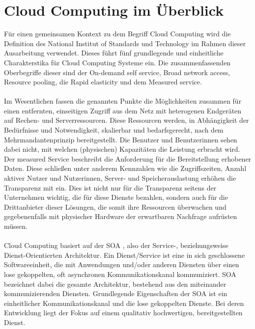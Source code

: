 \section{Cloud Computing im Überblick}
\label{VgmCC}
Für einen gemeinsamen Kontext zu dem Begriff Cloud Computing wird die Definition des National Institut of Standards und Technology im Rahmen dieser Ausarbeitung verwendet. Dieses führt fünf grundlegende und einheitliche Charakterstika für Cloud Computing Systeme ein. Die zusammenfassenden Oberbegriffe dieser sind der On-demand self service, Broad network access, Resource pooling, die Rapid elasticity und dem Measured service.
\\\\
Im Wesentlichen fassen die genannten Punkte die Möglichkeiten zusammen für einen entfernten, einseitigen Zugriff aus dem Netz mit heterogenen Endgeräten auf Rechen- und Serverressourcen. Diese Ressourcen werden, in Abhängigkeit der Bedürfnisse und Notwendigkeit, skalierbar und bedarfsgerecht, nach dem Mehrmandantenprinzip bereitgestellt. Die Benutzer und Benutzerinnen sehen dabei nicht, mit welchen (physischen) Kapazitäten die Leistung erbracht wird. Der measured Service beschreibt die Anforderung für die Bereitstellung erhobener Daten. Diese schließen unter anderem Kennzahlen wie die Zugriffszeiten, Anzahl aktiver Nutzer und Nutzerinnen, Server- und Speicherauslastung erhöhen die Transparenz mit ein. Dies ist nicht nur für die Transparenz seitens der Unternehmen wichtig, die für diese Dienste bezahlen, sondern auch für die Drittanbieter dieser Lösungen, die somit ihre Ressourcen überwachen und gegebenenfalls mit physischer Hardware der erwartbaren Nachfrage aufrüsten müssen. \cite{nist}
\\\\

Cloud Computing basiert auf der \ac{SOA} \cite{CcIBM}, also der Service-, beziehungsweise Dienst-Orientierten Architektur. Ein Dienst/Service ist eine in sich geschlossene Softwareeinheit, die mit Anwendungen und/oder anderen Diensten über einen lose gekoppelten, oft asynchronen Kommunikationskanal kommuniziert. \acs{SOA} bezeichnet dabei die gesamte Architektur, bestehend aus den miteinander kommunizierenden Diensten. Grundlegende Eigenschaften der \acs{SOA} ist ein einheitlicher Kommunikationskanal und die lose gekoppelten Dienste. Bei deren Entwicklung liegt der Fokus auf einem qualitativ hochwertigen, bereitgestellten Dienst. \cite{lewis2005service} \\\\

